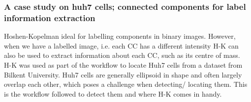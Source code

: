 \documentclass[a4paper]{article}
\begin{document}
\subsubsection{A case study on huh7 cells; connected components for label information extraction}

Hoshen-Kopelman ideal for labelling components in binary images. However, when we have a labelled image, i.e. each CC has a different intensity H-K can also be used to extract information about each CC, such as its centre of mass.\\
H-K was used as part of the workflow to locate Huh7 cells from a dataset from Bilkent University. Huh7 cells are generally ellipsoid in shape and often largely overlap each other, which poses a challenge when detecting/ locating them. This is the workflow followed to detect them and where H-K comes in handy.
\end{document}
